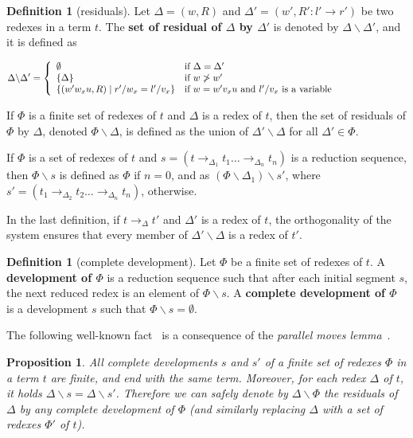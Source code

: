\documentclass{eptcs}
\theoremstyle{plain}
\newtheorem{proposition}[theorem]{Proposition}
\theoremstyle{definition}
\newtheorem{definition}[theorem]{Definition}
\begin{document}
\begin{definition}[residuals]
\label{de:residuals}
Let $\Delta = (w, R)$ and $\Delta' = (w', R': l' \rightarrow r')$ be 
two redexes in a term $t$. The {\bf set of residual of 
$\Delta$ by $\Delta'$} is denoted by $\Delta \backslash 
\Delta'$, and 
it is defined as

\[
\Delta \backslash \Delta' = \left\{
\begin{array}{lp{8cm}} \emptyset & if $\Delta = \Delta'$\\
\{\Delta\}  & if $w \not > w'$\\
\{(w'w_xu, R) \mid r'/w_x = l'/v_x\}  & if $w = w'v_xu$ and $l'/v_x$
is a variable 
\end{array}
\right.
\]

\noindent
If $\Phi$ is a finite set of redexes of $t$ and $\Delta$ is a redex of 
$t$, then the set of residuals of $\Phi$ by $\Delta$, denoted $\Phi 
\backslash \Delta$, is defined as the union of 
$\Delta' \backslash \Delta$ for all $\Delta' \in \Phi$.

If $\Phi$ is a set of redexes of $t$ and $s = \left(t 
\rightarrow_{\Delta_1} 
t_1 \ldots
\rightarrow_{\Delta_n} t_n\right)$ is a reduction sequence, then $\Phi 
\backslash s$ is defined as $\Phi$ if $n = 0$, and as $(\Phi 
\backslash 
\Delta_1) \backslash s'$, where $s' =  \left(t_1 
\rightarrow_{\Delta_2} t_2 
\ldots
\rightarrow_{\Delta_n} t_n\right)$, otherwise.
\end{definition}

In the last definition, if $t \rightarrow_\Delta t'$ and $\Delta'$ is 
a 
redex of $t$, the orthogonality of the system ensures that every 
member 
of $\Delta' \backslash \Delta$ is a redex of $t'$.



\begin{definition}[complete development]
Let $\Phi$ be a finite set of redexes of $t$. A {\bf development of 
$\Phi$} is 
a 
reduction sequence such that after each initial segment $s$, the next 
reduced redex is an element of $\Phi \backslash s$. A {\bf complete 
development of $\Phi$} is a development $s$ such that $\Phi \backslash 
s 
= \emptyset$.
\end{definition}

The following well-known fact~\cite{DBLP:journals/jacm/BerryL79} is a  
consequence of the {\em parallel moves lemma}~\cite{curry-feys:combinatory-logic}.

\begin{proposition}
All complete developments $s$ and $s'$ of a finite set of redexes 
$\Phi$ in a 
term $t$ 
are finite, and end with the same term. Moreover, for each redex 
$\Delta$ 
of $t$, it holds $\Delta \backslash s = \Delta \backslash s'$. 
Therefore 
we can safely denote by $\Delta \backslash \Phi$ the residuals of 
$\Delta$ by any complete development of $\Phi$ (and similarly 
replacing 
$\Delta$ with a set of redexes $\Phi'$ of $t$). 
\end{proposition}
\end{document}
